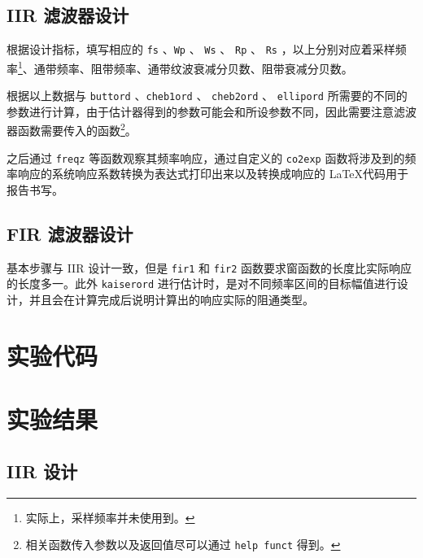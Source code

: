 \documentclass[lang=cn,11pt,a4paper,cite=authoryear]{elegantpaper}
\begin{document}
\subsection{IIR 滤波器设计}

根据设计指标，填写相应的 \lstinline{fs} 、\lstinline{Wp} 、 \lstinline{Ws} 、 \lstinline{Rp} 、 \lstinline{Rs} ，以上分别对应着采样频率\footnote{实际上，采样频率并未使用到。}、通带频率、阻带频率、通带纹波衰减分贝数、阻带衰减分贝数。

根据以上数据与 \lstinline{buttord} 、\lstinline{cheb1ord} 、 \lstinline{cheb2ord} 、 \lstinline{ellipord} 所需要的不同的参数进行计算，由于估计器得到的参数可能会和所设参数不同，因此需要注意滤波器函数需要传入的函数\footnote{相关函数传入参数以及返回值尽可以通过 \lstinline{help funct} 得到。}。

之后通过 \lstinline{freqz} 等函数观察其频率响应，通过自定义的 \lstinline{co2exp} 函数将涉及到的频率响应的系统响应系数转换为表达式打印出来以及转换成响应的 \LaTeX 代码用于报告书写。

\subsection{FIR 滤波器设计}

基本步骤与 IIR 设计一致，但是 \lstinline{fir1} 和 \lstinline{fir2} 函数要求窗函数的长度比实际响应的长度多一。此外 \lstinline{kaiserord} 进行估计时，是对不同频率区间的目标幅值进行设计，并且会在计算完成后说明计算出的响应实际的阻通类型。

\section{实验代码}








\section{实验结果}

\subsection{IIR 设计}
\end{document}
